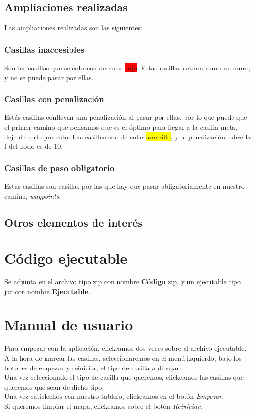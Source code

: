 \documentclass[es]{article}
\begin{document}
\subsection{Ampliaciones realizadas}
Las ampliaciones realizadas son las siguientes:
\subsubsection{Casillas inaccesibles}
Son las casillas que se colorean de color \colorbox{red}{rojo}. Estas casillas actúan como un muro, y no se puede pasar por ellas.
\subsubsection{Casillas con penalización}
Estás casillas conllevan una penalización al pasar por ellas, por lo que puede que el primer camino que pensamos que es el óptimo para llegar a la casilla meta, deje de serlo por esto. Las casillas son de color \colorbox{yellow}{amarillo}, y la penalización sobre la f del nodo es de 10.
\subsubsection{Casillas de paso obligatorio}
Estas casillas son casillas por las que hay que pasar obligatoriamente en nuestro camino, \textit{waypoints}.
\subsection{Otros elementos de interés}
\section{Código ejecutable}
Se adjunta en el archivo tipo zip con nombre \textbf{Código} zip, y un ejecutable tipo jar con nombre \textbf{Ejecutable}.
\section{Manual de usuario}
Para empezar con la aplicación, clickeamos dos veces sobre el archivo ejecutable.\\
A la hora de marcar las casillas, seleccionaremos en el menú izquierdo, bajo los botones de empezar y reiniciar, el tipo de casilla a dibujar.\\
Una vez seleccionado el tipo de casilla que queremos, clickeamos las casillas que queremos que sean de dicho tipo.\\
Una vez satisfechos con nuestro tablero, clickeamos en el botón \textit{Empezar}.\\
Si queremos limpiar el mapa, clickeamos sobre el botón \textit{Reiniciar}.
\end{document}
